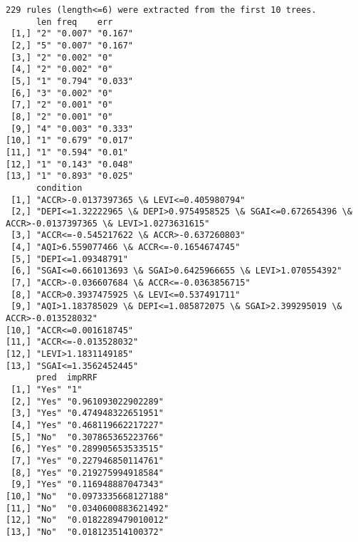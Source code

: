 \documentclass[11pt]{article}
\begin{document}
    \begin{Verbatim}[commandchars=\\\{\}]
229 rules (length<=6) were extracted from the first 10 trees.
      len freq    err    
 [1,] "2" "0.007" "0.167"
 [2,] "5" "0.007" "0.167"
 [3,] "2" "0.002" "0"    
 [4,] "2" "0.002" "0"    
 [5,] "1" "0.794" "0.033"
 [6,] "3" "0.002" "0"    
 [7,] "2" "0.001" "0"    
 [8,] "2" "0.001" "0"    
 [9,] "4" "0.003" "0.333"
[10,] "1" "0.679" "0.017"
[11,] "1" "0.594" "0.01" 
[12,] "1" "0.143" "0.048"
[13,] "1" "0.893" "0.025"
      condition                                                                                          
 [1,] "ACCR>-0.0137397365 \& LEVI<=0.405980794"                                                           
 [2,] "DEPI<=1.32222965 \& DEPI>0.9754958525 \& SGAI<=0.672654396 \& ACCR>-0.0137397365 \& LEVI>1.0273631615"
 [3,] "ACCR<=-0.545217622 \& ACCR>-0.637260803"                                                           
 [4,] "AQI>6.559077466 \& ACCR<=-0.1654674745"                                                            
 [5,] "DEPI<=1.09348791"                                                                                 
 [6,] "SGAI<=0.661013693 \& SGAI>0.6425966655 \& LEVI>1.070554392"                                         
 [7,] "ACCR>-0.036607684 \& ACCR<=-0.0363856715"                                                          
 [8,] "ACCR>0.3937475925 \& LEVI<=0.537491711"                                                            
 [9,] "AQI>1.183785029 \& DEPI<=1.085872075 \& SGAI>2.399295019 \& ACCR>-0.013528032"                       
[10,] "ACCR<=0.001618745"                                                                                
[11,] "ACCR<=-0.013528032"                                                                               
[12,] "LEVI>1.1831149185"                                                                                
[13,] "SGAI<=1.3562452445"                                                                               
      pred  impRRF              
 [1,] "Yes" "1"                 
 [2,] "Yes" "0.961093022902289" 
 [3,] "Yes" "0.474948322651951" 
 [4,] "Yes" "0.468119662217227" 
 [5,] "No"  "0.307865365223766" 
 [6,] "Yes" "0.289905653533515" 
 [7,] "Yes" "0.227946850114761" 
 [8,] "Yes" "0.219275994918584" 
 [9,] "Yes" "0.116948887047343" 
[10,] "No"  "0.0973335668127188"
[11,] "No"  "0.0340600883621492"
[12,] "No"  "0.0182289479010012"
[13,] "No"  "0.018123514100372" 

    \end{Verbatim}
\end{document}
